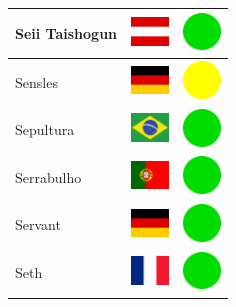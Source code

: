 \documentclass[12pt, a4paper, twoside]{report}
\begin{document}
\begin{center}
\begin{longtable}{|p{5cm}|p{2cm}|p{2cm}|}
 Seii Taishogun                                             & \includegraphics[width=1cm]{4x3/at} &   \includegraphics[width=1cm]{likes/y} \\ \hline
 Sensles                                                    & \includegraphics[width=1cm]{4x3/de} &   \includegraphics[width=1cm]{likes/m} \\ \hline
 Sepultura                                                  & \includegraphics[width=1cm]{4x3/br} &   \includegraphics[width=1cm]{likes/y} \\ \hline
 Serrabulho                                                 & \includegraphics[width=1cm]{4x3/pt} &   \includegraphics[width=1cm]{likes/y} \\ \hline
 Servant                                                    & \includegraphics[width=1cm]{4x3/de} &   \includegraphics[width=1cm]{likes/y} \\ \hline
 Seth                                                       & \includegraphics[width=1cm]{4x3/fr} &   \includegraphics[width=1cm]{likes/y} \\ \hline

\end{longtable}
\end{center}
\end{document}
